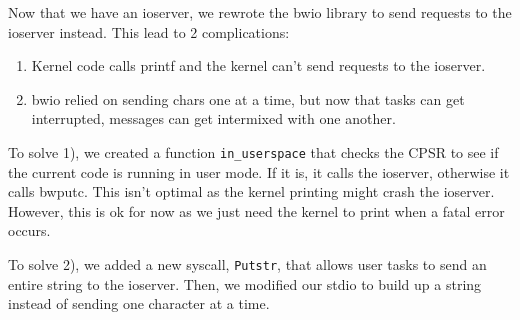\documentclass[letterpaper]{article}
\begin{document}
Now that we have an ioserver, we rewrote the bwio library to send requests to the ioserver instead. This lead to 2 complications:

\begin{enumerate}
  \item Kernel code calls printf and the kernel can't send requests to the ioserver.
  \item bwio relied on sending chars one at a time, but now that tasks can get interrupted, messages can get intermixed with one another.
\end{enumerate}

To solve 1), we created a function \verb!in_userspace! that checks the CPSR to see if the current code is running in user mode. If it is, it calls the ioserver, otherwise it calls bwputc. This isn't optimal as the kernel printing might crash the ioserver. However, this is ok for now as we just need the kernel to print when a fatal error occurs.

To solve 2), we added a new syscall, \verb!Putstr!, that allows user tasks to send an entire string to the ioserver. Then, we modified our stdio to build up a string instead of sending one character at a time.
\end{document}
